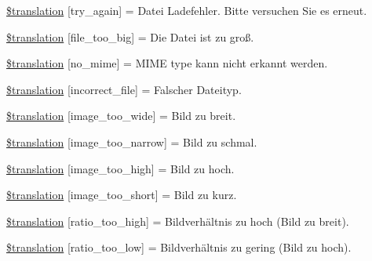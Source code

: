 \begin{DoxyCompactItemize}
\item 
\hyperlink{class_8upload_8de___d_e_8php_a3afc377bd803683314f413a814243066}{\$translation} \mbox{[}\textquotesingle{}try\+\_\+again\textquotesingle{}\mbox{]} = \textquotesingle{}Datei Ladefehler. Bitte versuchen Sie es erneut.\textquotesingle{}
\item 
\hyperlink{class_8upload_8de___d_e_8php_a476278eb4a0c3df56af068e2d511a741}{\$translation} \mbox{[}\textquotesingle{}file\+\_\+too\+\_\+big\textquotesingle{}\mbox{]} = \textquotesingle{}Die Datei ist zu groß.\textquotesingle{}
\item 
\hyperlink{class_8upload_8de___d_e_8php_a191a55df8e3bb7f3c51b70f3c1932e02}{\$translation} \mbox{[}\textquotesingle{}no\+\_\+mime\textquotesingle{}\mbox{]} = \textquotesingle{}M\+I\+M\+E type kann nicht erkannt werden.\textquotesingle{}
\item 
\hyperlink{class_8upload_8de___d_e_8php_a4d32343e2699edd6fd435f9c832cb9c7}{\$translation} \mbox{[}\textquotesingle{}incorrect\+\_\+file\textquotesingle{}\mbox{]} = \textquotesingle{}Falscher Dateityp.\textquotesingle{}
\item 
\hyperlink{class_8upload_8de___d_e_8php_a0dd3e4930ca1f59ae280f4b1006525cd}{\$translation} \mbox{[}\textquotesingle{}image\+\_\+too\+\_\+wide\textquotesingle{}\mbox{]} = \textquotesingle{}Bild zu breit.\textquotesingle{}
\item 
\hyperlink{class_8upload_8de___d_e_8php_a5c9a4cd67fd21c32e0a3b434591a6037}{\$translation} \mbox{[}\textquotesingle{}image\+\_\+too\+\_\+narrow\textquotesingle{}\mbox{]} = \textquotesingle{}Bild zu schmal.\textquotesingle{}
\item 
\hyperlink{class_8upload_8de___d_e_8php_aa27bde361343f3b63c7cd441860024f8}{\$translation} \mbox{[}\textquotesingle{}image\+\_\+too\+\_\+high\textquotesingle{}\mbox{]} = \textquotesingle{}Bild zu hoch.\textquotesingle{}
\item 
\hyperlink{class_8upload_8de___d_e_8php_a86fcd4e1157b00032df451188d735527}{\$translation} \mbox{[}\textquotesingle{}image\+\_\+too\+\_\+short\textquotesingle{}\mbox{]} = \textquotesingle{}Bild zu kurz.\textquotesingle{}
\item 
\hyperlink{class_8upload_8de___d_e_8php_a23396f6ce7f31e5e5f1b57580621d982}{\$translation} \mbox{[}\textquotesingle{}ratio\+\_\+too\+\_\+high\textquotesingle{}\mbox{]} = \textquotesingle{}Bildverhältnis zu hoch (Bild zu breit).\textquotesingle{}
\item 
\hyperlink{class_8upload_8de___d_e_8php_ac533b9a479f056b0b8623e4268f068c2}{\$translation} \mbox{[}\textquotesingle{}ratio\+\_\+too\+\_\+low\textquotesingle{}\mbox{]} = \textquotesingle{}Bildverhältnis zu gering (Bild zu hoch).\textquotesingle{}

\end{DoxyCompactItemize}
